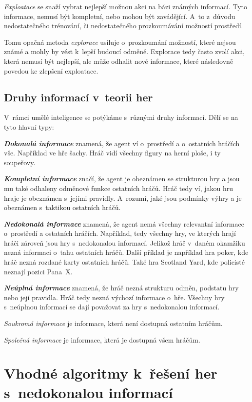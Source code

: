 \emph{Exploatace} se snaží vybrat nejlepší možnou akci na bázi známých informací.
Tyto informace, nemusí být kompletní, nebo mohou být zavádějící.
A~to z~důvodu nedostatečného trénování, či nedostatečného prozkoumávání možností prostředí.

Tomu opačná metoda \emph{explorace} usiluje o~prozkoumání možností, které nejsou známé a mohly by vést k~lepší budoucí odměně.
Explorace tedy často zvolí akci, která nemusí být nejlepší, ale může odhalit nové informace, které následovně povedou ke zlepšení exploatace.

\subsection{Druhy informací v~teorii her}\label{subsec:druhy-informaci-v-teorii-her}
V~rámci umělé inteligence se potýkáme s~různými druhy informací.
Dělí se na tyto hlavní typy:

\textbf{\emph{Dokonalá informace}} znamená, že agent ví o~prostředí a o~ostatních hráčích vše.
Například ve hře šachy.
Hráč vidí všechny figury na herní ploše, i ty soupeřovy.

\textbf{\emph{Kompletní informace}} značí, že agent je obeznámen se strukturou hry a jsou mu také odhaleny odměnové funkce ostatních hráčů.
Hráč tedy ví, jakou hru hraje je obeznámen s~jejími pravidly.
A~rozumí, jaké jsou podmínky výhry a je obeznámen s~taktikou ostatních hráčů.

\textbf{\emph{Nedokonalá informace}} znamená, že agent nemá všechny relevantní informace o~prostředí a ostatních hráčích.
Například, tedy všechny hry, ve kterých hrají hráči zároveň jsou hry s~nedokonalou informací.
Jelikož hráč v~daném okamžiku nezná informaci o~tahu ostatních hráčů.
Další příklad je například hra poker, kde hráč nezná rozdané karty ostatních hráčů.
Také hra Scotland Yard, kde policisté neznají pozici Pana~X\@.

\textbf{\emph{Neúplná informace}} znamená, že hráč nezná strukturu odměn, podstatu hry nebo její pravidla.
Hráč tedy nezná výchozí informace o~hře.
Všechny hry s~neúplnou informací se dají považovat za hry s~nedokonalou informací.

\emph{Soukromá informace} je informace, která není dostupná ostatním hráčům.

\emph{Společná informace} je informace, která je dostupná všem hráčům.


\section{Vhodné algoritmy k~řešení her s~nedokonalou informací}\label{sec:vhodne-algoritmy-k-reseni-her-s-nedokonalou-informaci}

